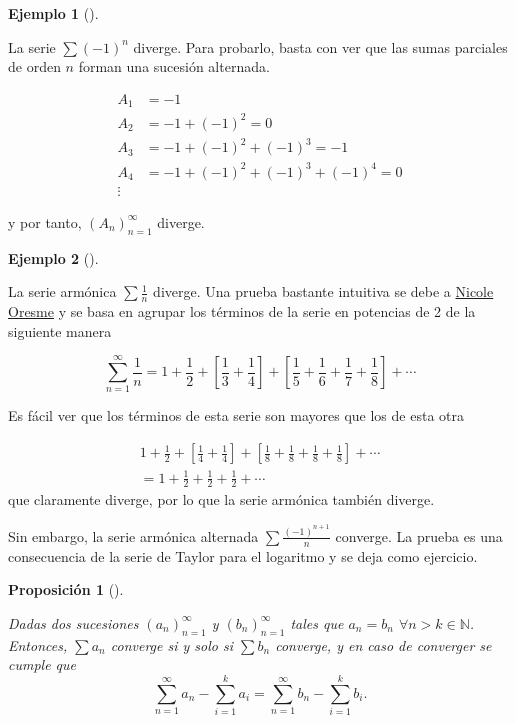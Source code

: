 \documentclass[
  a4paper,
]{scrreport}
\theoremstyle{plain}
\theoremstyle{plain}
\newtheorem{proposition}{Proposición}[chapter]
\theoremstyle{definition}
\theoremstyle{definition}
\newtheorem{example}{Ejemplo}[chapter]
\theoremstyle{plain}
\theoremstyle{remark}
\begin{document}
\leavevmode{}%
\begin{example}[]\label{exm-serie-divergente}

La serie \(\sum (-1)^n\) diverge. Para probarlo, basta con ver que las
sumas parciales de orden \(n\) forman una sucesión alternada.

\begin{align*}
A_1 &= -1\\ 
A_2 &= -1+ (-1)^2 = 0 \\ 
A_3 &= -1+ (-1)^2 + (-1)^3 = -1\\ 
A_4 &= -1+ (-1)^2 + (-1)^3 + (-1)^4= 0\\ 
\vdots 
\end{align*}

y por tanto, \((A_n)_{n=1}^\infty\) diverge.

\end{example}

\leavevmode{}%
\begin{example}[]\label{exm-divergencia-serie-armonica}

La serie armónica \(\sum \frac{1}{n}\) diverge. Una prueba bastante
intuitiva se debe a
\href{https://es.wikipedia.org/wiki/Nicol\%C3\%A1s_Oresme}{Nicole
Oresme} y se basa en agrupar los términos de la serie en potencias de 2
de la siguiente manera

\[
\sum_{n=1}^\infty \frac{1}{n} = 1 + \frac{1}{2} + \left[\frac{1}{3}+\frac{1}{4}\right] + \left[\frac{1}{5}+\frac{1}{6}+\frac{1}{7}+\frac{1}{8}\right] + \cdots
\]

Es fácil ver que los términos de esta serie son mayores que los de esta
otra

\[
\begin{gathered}
1 + \frac{1}{2} + \left[\frac{1}{4}+\frac{1}{4}\right] + \left[\frac{1}{8}+\frac{1}{8}+\frac{1}{8}+\frac{1}{8}\right] + \cdots \\ 
= 1 +\frac{1}{2} + \frac{1}{2} + \frac{1}{2} + \cdots
\end{gathered}
\] que claramente diverge, por lo que la serie armónica también diverge.

Sin embargo, la serie armónica alternada \(\sum \frac{(-1)^{n+1}}{n}\)
converge. La prueba es una consecuencia de la serie de Taylor para el
logaritmo y se deja como ejercicio.

\end{example}

\leavevmode{}%
\begin{proposition}[]\label{prp-series-iguales-excepto-n-terminos}

Dadas dos sucesiones \((a_n)_{n=1}^\infty\) y \((b_n)_{n=1}^\infty\)
tales que \(a_n=b_n\) \(\forall n>k\in\mathbb{N}\). Entonces,
\(\sum a_n\) converge si y solo si \(\sum b_n\) converge, y en caso de
converger se cumple que \[
\sum_{n=1}^\infty a_n-\sum_{i=1}^{k}a_i=\sum_{n=1}^\infty b_n-\sum_{i=1}^{k}b_i.
\]

\end{proposition}
\end{document}
